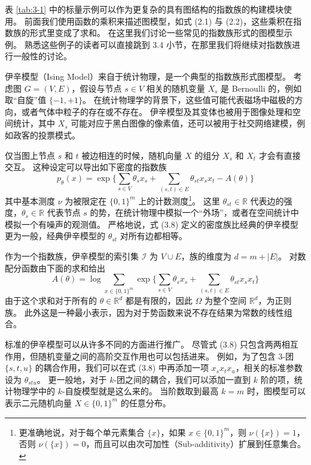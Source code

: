 表 \ref{tab:3-1} 中的标量示例可以作为更复杂的具有图结构的指数族的构建模块使用。
前面我们使用函数的乘积来描述图模型，如式 (2.1) 与 (2.2)，这些乘积在指数族的形式里变成了求和。
在这里我们讨论一些常见的指数族形式的图模型示例。
熟悉这些例子的读者可以直接跳到 3.4 小节，在那里我们将继续对指数族进行一般性的讨论。

\begin{tcolorbox}
\begin{exam}[伊辛模型]

伊辛模型（Ising Model）来自于统计物理，是一个典型的指数族形式图模型。
考虑图 $G = (V, E)$，假设与节点 $s \in V$ 相关的随机变量 $X_s$ 是 Bernoulli 的，例如取“自旋”值 $\{-1, +1\}$。
在统计物理学的背景下，这些值可能代表磁场中磁极的方向，或者气体中粒子的存在或不存在。
伊辛模型及其变体也被用于图像处理和空间统计，其中 $X_s$ 可能对应于黑白图像的像素值，还可以被用于社交网络建模，例如政客的投票模式。

仅当图上节点 $s$ 和 $t$ 被边相连的时候，随机向量 $X$ 的组分 $X_s$ 和 $X_t$ 才会有直接交互。
这种设定可以导出如下密度的指数族
\begin{equation}
    p_{\theta}(x) = \exp{\{\sum_{s \in V}\theta_sx_s + \sum_{(s, t) \in E}\theta_{st}x_sx_t - A(\theta)\}}
\end{equation}
其中基本测度 $\nu$ 为被限定在 $\{0, 1\}^m$ 上的计数测度\footnote{更准确地说，对于每个单元素集合 $\{x\}$，如果 $x \in \{0, 1\}^m$，则 $\nu(\{x\}) = 1$，否则 $\nu(\{x\}) = 0$，而且可以由次可加性（Sub-additivity）扩展到任意集合。}。
这里 $\theta_{st} \in \mathbb{R}$ 代表边的强度，$\theta_s \in \mathbb{R}$ 代表节点 $s$ 的势，在统计物理中模拟一个“外场”，或者在空间统计中模拟一个有噪声的观测值。
严格地说，式 (3.8) 定义的密度族比经典的伊辛模型更为一般，经典伊辛模型的 $\theta_{st}$ 对所有边都相等。

作为一个指数族，伊辛模型的索引集 $\mathcal{I}$ 为 $V \cup E$，族的维度为 $d = m + |E|$。
对数配分函数由下面的求和给出
\begin{equation}
    A(\theta) = \log{\sum_{x \in \{0, 1\}^m}\exp{\{\sum_{s \in V}\theta_sx_s + \sum_{(s, t) \in E}\theta_{st}x_sx_t\}}}
\end{equation}
由于这个求和对于所有的 $\theta \in \mathbb{R}^d$ 都是有限的，因此 $\Omega$ 为整个空间 $\mathbb{R}^d$，为正则族。
此外这是一种最小表示，因为对于势函数来说不存在结果为常数的线性组合。

标准的伊辛模型可以从许多不同的方面进行推广。
尽管式 (3.8) 只包含两两相互作用，但随机变量之间的高阶交互作用也可以包括进来。
例如，为了包含 3-团 $\{s, t, u\}$ 的耦合作用，我们可以在式 (3.8) 中再添加一项 $x_sx_tx_u$，相关的标准参数设为 $\theta_{stu}$。
更一般地，对于 $k$-团之间的耦合，我们可以添加一直到 $k$ 阶的项，统计物理学中的 $k$-自旋模型就是这么来的。
当阶数取到最高 $k = m$ 时，图模型可以表示二元随机向量 $X \in \{0, 1\}^m$ 的任意分布。

\end{exam}
\end{tcolorbox}

